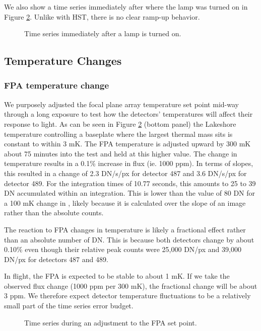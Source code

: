 \documentclass{aastex62}
\begin{document}
We also show a time series immediately after where the lamp was turned on in Figure \ref{fig:indTSeriesAfterLamp}.
Unlike with HST, there is no clear ramp-up behavior.

\begin{figure}
{}
\caption{Time series immediately after a lamp is turned on.}\label{fig:indTSeriesAfterLamp}
\end{figure}


\clearpage
\subsection{Temperature Changes}
\subsubsection{FPA temperature change}
We purposely adjusted the focal plane array temperature set point mid-way through a long exposure to test how the detectors' temperatures will affect their response to light.
As can be seen in Figure \ref{fig:indTSeriesAfterLamp} (bottom panel) the Lakeshore temperature controlling a baseplate where the largest thermal mass sits is constant to within 3 mK.
The FPA temperature is adjusted upward by 300 mK about 75 minutes into the test and held at this higher value.
The change in temperature results in a 0.1\% increase in flux (ie. 1000 ppm).
In terms of slopes, this resulted in a change of 2.3 DN/s/px for detector 487 and 3.6 DN/s/px for detector 489.
For the integration times of 10.77 seconds, this amounts to 25 to 39 DN accumulated within an integration.
This is lower than the value of 80 DN for a 100 mK change in \citet{hall2005jwstArrays}, likely because it is calculated over the slope of an image rather than the absolute counts.

The reaction to FPA changes in temperature is likely a fractional effect rather than an absolute number of DN.
This is because both detectors change by about 0.10\% even though their relative peak counts were 25,000 DN/px and 39,000 DN/px for detectors 487 and 489.

In flight, the FPA is expected to be stable to about 1 mK.
If we take the observed flux change (1000 ppm per 300 mK), the fractional change will be about 3 ppm. We therefore expect detector temperature fluctuations to be a relatively small part of the time series error budget.

\begin{figure}
{}
\caption{Time series during an adjustment to the FPA set point.}\label{fig:indTSeriesAfterLamp}
\end{figure}
\end{document}
